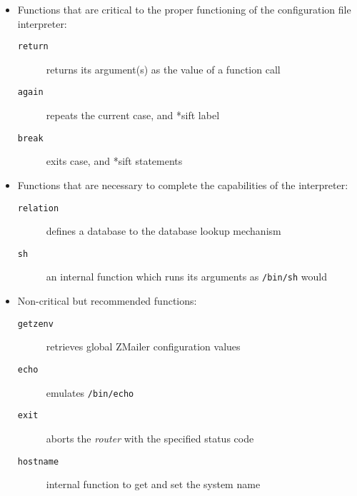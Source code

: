 \begin{itemize}
\item
Functions that are critical to the proper functioning of the configuration
file interpreter:

\begin{description}
\item[{\tt return}] \mbox{}

returns its argument(s) as the value of a function call

\item[{\tt again}] \mbox{}

repeats the current case, and *sift label

\item[{\tt break}] \mbox{}

exits case, and *sift statements

\end{description}


\item
Functions that are necessary to complete the capabilities of the
interpreter:

\begin{description}
\item[{\tt relation}] \mbox{}

defines a database to the database lookup mechanism

\item[{\tt sh}] \mbox{}

an internal function which runs its arguments as {\tt /bin/sh} would

\end{description}


\item
Non-critical but recommended functions:

\begin{description}
\item[{\tt getzenv}] \mbox{}

retrieves global ZMailer configuration values

\item[{\tt echo}] \mbox{}

emulates {\tt /bin/echo}

\item[{\tt exit}] \mbox{}

aborts the {\em router} with the specified status code

\item[{\tt hostname}] \mbox{}

internal function to get and set the system name


\end{description}
\end{itemize}
